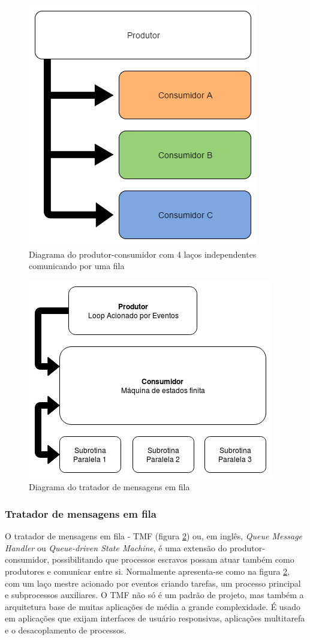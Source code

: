 \begin{figure}
    \centering
        \includegraphics[width=0.5\linewidth]{fig/patt/produtorconsumidor}
            \caption{Diagrama do produtor-consumidor com 4 laços independentes comunicando por uma fila}
            \label{fig:prodcon}
\end{figure}

\begin{figure}
    \centering
        \includegraphics[width=0.7\linewidth]{fig/patt/tmf}
            \caption{Diagrama do tratador de mensagens em fila}
            \label{fig:tmf}
\end{figure}


\subsubsection{Tratador de mensagens em fila}
O tratador de mensagens em fila - TMF (figura \ref{fig:tmf}) ou, em inglês, \textit{Queue Message Handler} ou \textit{Queue-driven State Machine}, é uma extensão do produtor-consumidor, possibilitando que processos escravos possam atuar também como produtores e comunicar entre si. Normalmente apresenta-se como na figura \ref{fig:tmf}, com um laço mestre acionado por eventos criando tarefas, um processo principal e subprocessos auxiliares. O TMF não só é um padrão de projeto, mas também a arquitetura base de muitas aplicações de média a grande complexidade. É usado em aplicações que exijam interfaces de usuário responsivas, aplicações multitarefa e o desacoplamento de processos.


